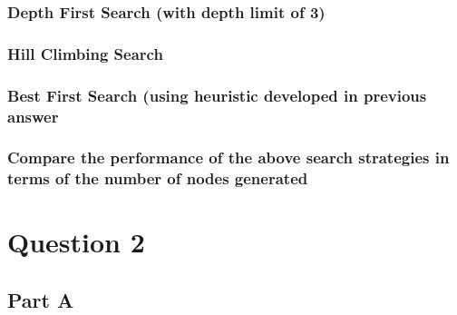\documentclass[a4paper]{article}
\begin{document}
\subsubsection{Depth First Search (with depth limit of 3)}

\subsubsection{Hill Climbing Search}

\subsubsection{Best First Search (using heuristic developed in previous answer}

\subsubsection{Compare the performance of the above search strategies in terms of the number of nodes generated}

\section{Question 2}


\subsection{Part A}
\end{document}
